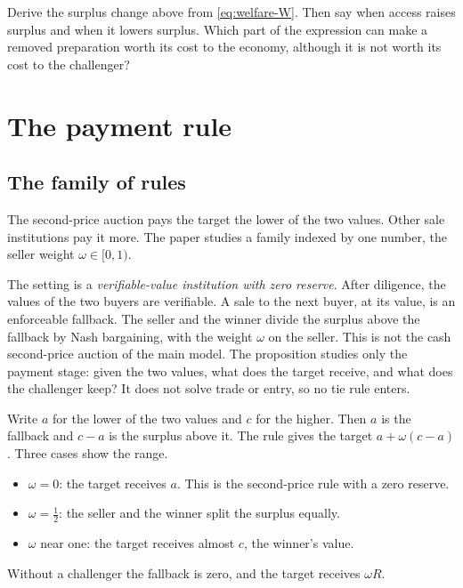 \begin{checkyourself}\label{q:welfare-sign}
Derive the surplus change above from \eqref{eq:welfare-W}. Then say when access raises surplus and when it lowers
surplus. Which part of the expression can make a removed preparation worth its cost to the economy, although it is not
worth its cost to the challenger?
\end{checkyourself}

\section{The payment rule}\label{sec:welfare-payment}

\subsection{The family of rules}\label{sec:welfare-family}

The second-price auction pays the target the lower of the two values. Other sale institutions pay it more. The paper
studies a family indexed by one number, the seller weight \(\omega\in[0,1)\).

The setting is a \emph{verifiable-value institution with zero reserve}. After diligence, the values of the two buyers
are verifiable. A sale to the next buyer, at its value, is an enforceable fallback. The seller and the winner divide the
surplus above the fallback by Nash bargaining, with the weight \(\omega\) on the seller. This is not the cash
second-price auction of the main model. The proposition studies only the payment stage: given the two values, what does
the target receive, and what does the challenger keep? It does not solve trade or entry, so no tie rule enters.

Write \(a\) for the lower of the two values and \(c\) for the higher. Then \(a\) is the fallback and \(c-a\) is the
surplus above it. The rule gives the target \(a+\omega(c-a)\). Three cases show the range.
\begin{itemize}
\item \(\omega=0\): the target receives \(a\). This is the second-price rule with a zero reserve.
\item \(\omega=\tfrac12\): the seller and the winner split the surplus equally.
\item \(\omega\) near one: the target receives almost \(c\), the winner's value.
\end{itemize}
Without a challenger the fallback is zero, and the target receives \(\omega R\).


